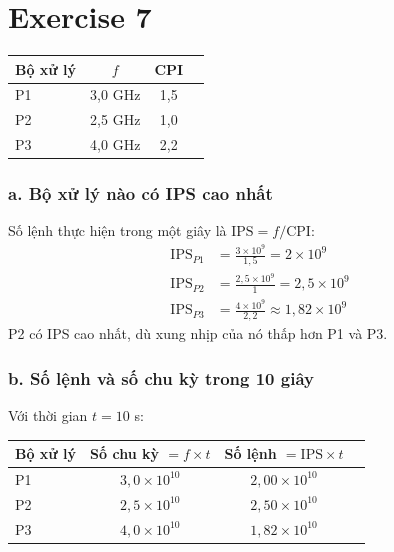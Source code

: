 \section{Exercise 7}

\begin{center}
\begin{tabular}{lccc}
  \toprule
  Bộ xử lý & $f$ & CPI\\
  \midrule
  P1 & 3{,}0 GHz & 1{,}5 \\
  P2 & 2{,}5 GHz & 1{,}0 \\
  P3 & 4{,}0 GHz & 2{,}2 \\
  \bottomrule
\end{tabular}
\end{center}

\subsubsection*{a. Bộ xử lý nào có IPS cao nhất}

Số lệnh thực hiện trong một giây là $\text{IPS} = f / \text{CPI}$:
\begin{align*}
  \text{IPS}_{P1} &= \frac{3 \times 10^9}{1{,}5} = 2 \times 10^9 \\
  \text{IPS}_{P2} &= \frac{2{,}5 \times 10^9}{1} = 2{,}5 \times 10^9 \\
  \text{IPS}_{P3} &= \frac{4 \times 10^9}{2{,}2} \approx 1{,}82 \times 10^9
\end{align*}
P2 có IPS cao nhất, dù xung nhịp của nó thấp hơn P1 và P3.

\subsubsection*{b. Số lệnh và số chu kỳ trong 10 giây}

Với thời gian $t = 10$ s:

\begin{center}
\begin{tabular}{lccc}
  \toprule
  Bộ xử lý & Số chu kỳ $= f \times t$ & Số lệnh $= \text{IPS} \times t$ \\
  \midrule
  P1 & $3{,}0 \times 10^{10}$ & $2{,}00 \times 10^{10}$ \\
  P2 & $2{,}5 \times 10^{10}$ & $2{,}50 \times 10^{10}$ \\
  P3 & $4{,}0 \times 10^{10}$ & $1{,}82 \times 10^{10}$ \\
  \bottomrule
\end{tabular}
\end{center}

